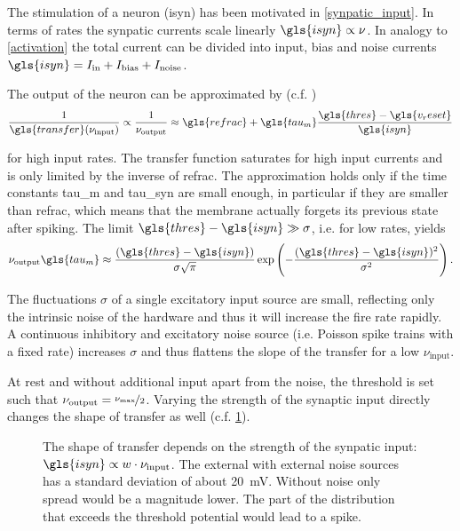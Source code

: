 The stimulation of a neuron (\gls{isyn}) has been motivated in \cref{synpatic_input}. In terms of rates the synpatic currents scale linearly $\gls{isyn} \propto \nu$. In analogy to \cref{activation} the total current can be divided into input, bias and noise currents $\gls{isyn} = I_\text{in} + I_\text{bias} + I_\text{noise}$.

The output of the neuron can be approximated by (c.f. \cite{brunel2000dynamics})
\begin{equation}\label{fireratehigh}
\frac{1}{\gls{transfer}(\nu_\text{input})} \propto \frac{1}{\nu_\text{output}} \approx \gls{refrac} + \gls{tau_m} \frac{\gls{thres} - \gls{v_reset}}{\gls{isyn}}
\end{equation}

for high input rates. The transfer function saturates for high input currents and is only limited by the inverse of \gls{refrac}. The approximation holds only if the time constants \gls{tau_m} and \gls{tau_syn} are small enough, in particular if they are smaller than \gls{refrac}, which means that the membrane actually forgets its previous state after spiking. The limit $\gls{thres} - \gls{isyn} \gg \sigma$, i.e. for low rates, yields
\begin{equation}\label{fireratelow}
\nu_\text{output} \gls{tau_m} \approx \frac{(\gls{thres} - \gls{isyn})}{\sigma \sqrt{\pi}} \exp\left(-\frac{(\gls{thres} - \gls{isyn})^2}{\sigma^2}\right).
\end{equation}

The fluctuations $\sigma$ of a single excitatory input source are small, reflecting only the intrinsic noise of the hardware and thus it will increase the fire rate rapidly. A continuous inhibitory and excitatory noise source (i.e. Poisson spike trains with a fixed rate) increases $\sigma$ and thus flattens the slope of the \gls{transfer} for a low $\nu_\text{input}$. 

At rest and without additional input apart from the noise, the threshold is set such that $\nu_\text{output} = \nicefrac{\nu_\text{max}}{2}$. Varying the strength of the synaptic input directly changes the shape of \gls{transfer} as well (c.f. \cref{transferfunction}).

\begin{figure}
	\label{transferfunction}
	\begin{center}
		
	\end{center}
	\caption{The shape of \gls{transfer} depends on the strength of the synpatic input: $\gls{isyn} \propto w \cdot \nu_\text{input}$. The external  with external noise sources has a standard deviation of about \SI{20}{\milli\V}. Without noise only spread would be a magnitude lower. The part of the distribution that exceeds the threshold potential would lead to a spike.}
\end{figure}

